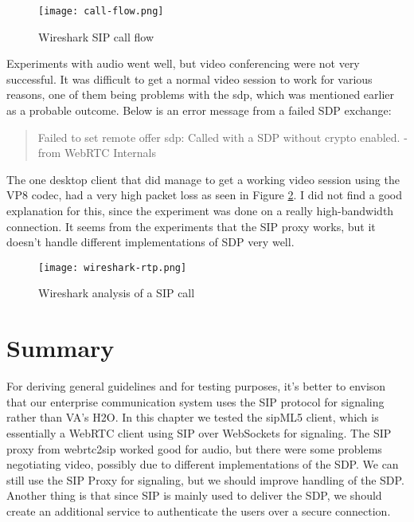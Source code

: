 \begin{figure}[here]
\centerline{\texttt{[image: call-flow.png]}}
\caption{Wireshark SIP call flow}
\label{fig:wireshark-sip-call-flow}
\end{figure}

\newpage
Experiments with audio went well, but video conferencing were not very successful. It was difficult to get a normal video session to work for various reasons, one of them being problems with the \gls{sdp}, which was mentioned earlier as a probable outcome. Below is an error message from a failed SDP exchange:

\begin{quote}
Failed to set remote offer sdp: Called with a SDP without crypto enabled. -from WebRTC Internals
\end{quote}

The one desktop client that did manage to get a working video session using the VP8 codec, had a very high packet loss as seen in Figure \ref{fig:wireshark-sip-call}. I did not find a good explanation for this, since the experiment was done on a really high-bandwidth connection. It seems from the experiments that the SIP proxy works, but it doesn't handle different implementations of SDP very well.

\begin{figure}[here]
\centerline{\texttt{[image: wireshark-rtp.png]}}
\caption{Wireshark analysis of a SIP call}
\label{fig:wireshark-sip-call}
\end{figure}

\newpage
\section{Summary}
For deriving general guidelines and for testing purposes, it's better to envison that our enterprise communication system uses the SIP protocol for signaling rather than VA's H2O. In this chapter we tested the sipML5 client, which is essentially a WebRTC client using SIP over WebSockets for signaling. The SIP proxy from webrtc2sip worked good for audio, but there were some problems negotiating video, possibly due to different implementations of the SDP. We can still use the SIP Proxy for signaling, but we should improve handling of the SDP. Another thing is that since SIP is mainly used to deliver the SDP, we should create an additional service to authenticate the users over a secure connection.
